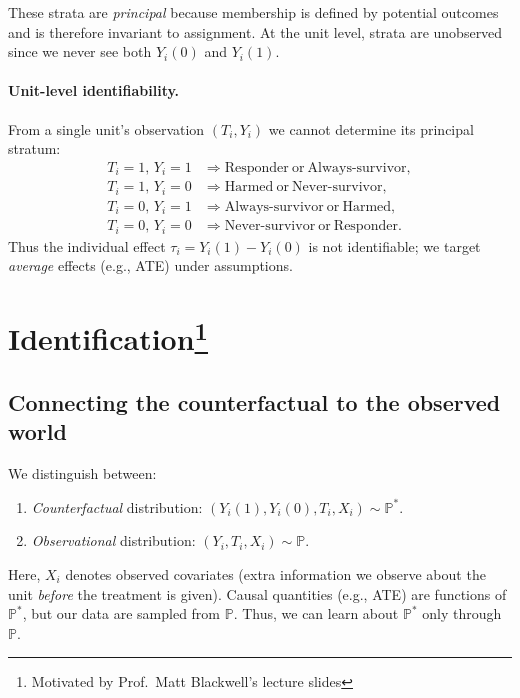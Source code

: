 \documentclass[11pt]{exam}
\theoremstyle{plain}
\begin{document}
These strata are \emph{principal} because membership is defined by potential outcomes and is therefore invariant to assignment. At the unit level, strata are unobserved since we never see both $Y_i(0)$ and $Y_i(1)$.

\paragraph{Unit-level identifiability.}
From a single unit’s observation $(T_i,Y_i)$ we cannot determine its principal stratum:
\[
\begin{aligned}
T_i=1,\,Y_i=1 &\Rightarrow \text{Responder} \ \text{or}\ \text{Always-survivor} ,\\
T_i=1,\,Y_i=0 &\Rightarrow \text{Harmed} \ \text{or}\ \text{Never-survivor},\\
T_i=0,\,Y_i=1 &\Rightarrow \text{Always-survivor} \ \text{or}\ \text{Harmed},\\
T_i=0,\,Y_i=0 &\Rightarrow \text{Never-survivor} \ \text{or}\ \text{Responder}.
\end{aligned}
\]
Thus the individual effect $\tau_i=Y_i(1)-Y_i(0)$ is not identifiable; we target \emph{average} effects (e.g., ATE) under assumptions.




\section[Identification]{Identification\footnote{Motivated by Prof.\ Matt Blackwell's lecture slides}}

\subsection{Connecting the counterfactual to the observed world}

We distinguish between:
\begin{enumerate}
  \item \emph{Counterfactual} distribution: $(Y_i(1), Y_i(0), T_i, X_i) \sim \mathbb{P}^{\ast}$.
  \item \emph{Observational} distribution: $(Y_i, T_i, X_i) \sim \mathbb{P}$.
\end{enumerate}
Here, $X_i$ denotes observed covariates (extra information we observe about the unit \emph{before} the treatment is given). Causal quantities (e.g., ATE) are functions of $\mathbb{P}^{\ast}$, but our data are sampled from $\mathbb{P}$. Thus, we can learn about $\mathbb{P}^{\ast}$ only through $\mathbb{P}$.
\end{document}
